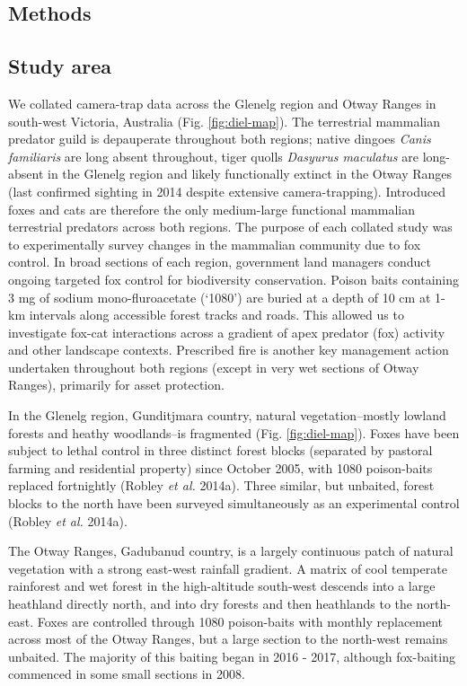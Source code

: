 \documentclass[11pt,a4paper,titlepage,twoside,openright]{style/unimelbthesis}
\begin{document}
\begin{mainmatter}
\newpage

\hypertarget{methods-1}{%
\section{Methods}\label{methods-1}}

\hypertarget{study-area-1}{%
\subsection{Study area}\label{study-area-1}}

We collated camera-trap data across the Glenelg region and Otway Ranges in south-west Victoria, Australia (Fig. \ref{fig:diel-map}). The terrestrial mammalian predator guild is depauperate throughout both regions; native dingoes \emph{Canis familiaris} are long absent throughout, tiger quolls \emph{Dasyurus maculatus} are long-absent in the Glenelg region and likely functionally extinct in the Otway Ranges (last confirmed sighting in 2014 despite extensive camera-trapping). Introduced foxes and cats are therefore the only medium-large functional mammalian terrestrial predators across both regions. The purpose of each collated study was to experimentally survey changes in the mammalian community due to fox control. In broad sections of each region, government land managers conduct ongoing targeted fox control for biodiversity conservation. Poison baits containing 3 mg of sodium mono-fluroacetate (`1080') are buried at a depth of 10 cm at 1-km intervals along accessible forest tracks and roads. This allowed us to investigate fox-cat interactions across a gradient of apex predator (fox) activity and other landscape contexts. Prescribed fire is another key management action undertaken throughout both regions (except in very wet sections of Otway Ranges), primarily for asset protection.

In the Glenelg region, Gunditjmara country, natural vegetation--mostly lowland forests and heathy woodlands--is fragmented (Fig. \ref{fig:diel-map}). Foxes have been subject to lethal control in three distinct forest blocks (separated by pastoral farming and residential property) since October 2005, with 1080 poison-baits replaced fortnightly (Robley \emph{et al.} 2014a). Three similar, but unbaited, forest blocks to the north have been surveyed simultaneously as an experimental control (Robley \emph{et al.} 2014a).

The Otway Ranges, Gadubanud country, is a largely continuous patch of natural vegetation with a strong east-west rainfall gradient. A matrix of cool temperate rainforest and wet forest in the high-altitude south-west descends into a large heathland directly north, and into dry forests and then heathlands to the north-east. Foxes are controlled through 1080 poison-baits with monthly replacement across most of the Otway Ranges, but a large section to the north-west remains unbaited. The majority of this baiting began in 2016 - 2017, although fox-baiting commenced in some small sections in 2008.


\end{mainmatter}
\end{document}
